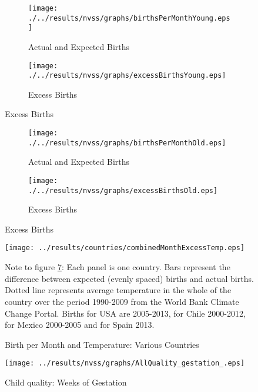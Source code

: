 \begin{figure}[htpb!]
\centering
\caption{Proportion of Births by Month (Young)}
\label{bqFig:MonthsYoung}
\begin{subfigure}{.5\textwidth}
  \centering
  \texttt{[image: ./../results/nvss/graphs/birthsPerMonthYoung.eps]}
  \caption{Actual and Expected Births}
  \label{bqFig:bMonthAE_Y}
\end{subfigure}%
\begin{subfigure}{.5\textwidth}
  \centering
  \texttt{[image: ./../results/nvss/graphs/excessBirthsYoung.eps]}
  \caption{Excess Births}
  \label{bqFig:bMonthA-E_Y}
\end{subfigure}
\end{figure}

\begin{figure}[htpb!]
\centering
\caption{Proportion of Births by Month (Old)}
\label{bqFig:MonthsOld}
\begin{subfigure}{.5\textwidth}
  \centering
  \texttt{[image: ./../results/nvss/graphs/birthsPerMonthOld.eps]}
  \caption{Actual and Expected Births}
  \label{bqFig:bMonthAE_O}
\end{subfigure}%
\begin{subfigure}{.5\textwidth}
  \centering
  \texttt{[image: ./../results/nvss/graphs/excessBirthsOld.eps]}
  \caption{Excess Births}
  \label{bqFig:bMonthA-E_O}
\end{subfigure}
\end{figure}

\begin{figure}[htpb!]
\begin{center}
\caption{Birth per Month and Temperature: Various Countries}
\label{bqFig:excessTemp}
\texttt{[image: ../results/countries/combinedMonthExcessTemp.eps]}
\end{center}
{\footnotesize Note to figure \ref{bqFig:excessTemp}: Each panel is one country.  Bars
represent the difference between expected (evenly spaced) births and actual births.  
Dotted line represents average temperature in the whole of the country over the period
1990-2009 from the World Bank Climate Change Portal.  Births for USA are 2005-2013, for
Chile 2000-2012, for Mexico 2000-2005 and for Spain 2013.}
\end{figure}
\vspace{5mm}


\begin{figure}[htpb!]
\centering
\caption{Child quality: Weeks of Gestation}
\label{QApgar}
\texttt{[image: ../results/nvss/graphs/AllQuality\_gestation\_.eps]}
\end{figure}
\vspace{5mm}

